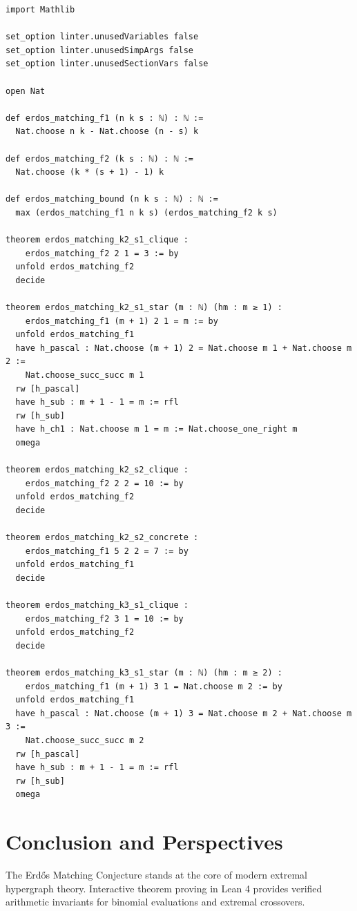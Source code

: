 \documentclass[11pt,a4paper]{article}
\theoremstyle{definition}
\begin{document}
\begin{lstlisting}[caption={Formal Lean 4 Implementation of Erdős Matching Bounds}]
import Mathlib

set_option linter.unusedVariables false
set_option linter.unusedSimpArgs false
set_option linter.unusedSectionVars false

open Nat

def erdos_matching_f1 (n k s : ℕ) : ℕ :=
  Nat.choose n k - Nat.choose (n - s) k

def erdos_matching_f2 (k s : ℕ) : ℕ :=
  Nat.choose (k * (s + 1) - 1) k

def erdos_matching_bound (n k s : ℕ) : ℕ :=
  max (erdos_matching_f1 n k s) (erdos_matching_f2 k s)

theorem erdos_matching_k2_s1_clique :
    erdos_matching_f2 2 1 = 3 := by
  unfold erdos_matching_f2
  decide

theorem erdos_matching_k2_s1_star (m : ℕ) (hm : m ≥ 1) :
    erdos_matching_f1 (m + 1) 2 1 = m := by
  unfold erdos_matching_f1
  have h_pascal : Nat.choose (m + 1) 2 = Nat.choose m 1 + Nat.choose m 2 :=
    Nat.choose_succ_succ m 1
  rw [h_pascal]
  have h_sub : m + 1 - 1 = m := rfl
  rw [h_sub]
  have h_ch1 : Nat.choose m 1 = m := Nat.choose_one_right m
  omega

theorem erdos_matching_k2_s2_clique :
    erdos_matching_f2 2 2 = 10 := by
  unfold erdos_matching_f2
  decide

theorem erdos_matching_k2_s2_concrete :
    erdos_matching_f1 5 2 2 = 7 := by
  unfold erdos_matching_f1
  decide

theorem erdos_matching_k3_s1_clique :
    erdos_matching_f2 3 1 = 10 := by
  unfold erdos_matching_f2
  decide

theorem erdos_matching_k3_s1_star (m : ℕ) (hm : m ≥ 2) :
    erdos_matching_f1 (m + 1) 3 1 = Nat.choose m 2 := by
  unfold erdos_matching_f1
  have h_pascal : Nat.choose (m + 1) 3 = Nat.choose m 2 + Nat.choose m 3 :=
    Nat.choose_succ_succ m 2
  rw [h_pascal]
  have h_sub : m + 1 - 1 = m := rfl
  rw [h_sub]
  omega
\end{lstlisting}

\section{Conclusion and Perspectives}
The Erd\H{o}s Matching Conjecture stands at the core of modern extremal hypergraph theory. Interactive theorem proving in Lean 4 provides verified arithmetic invariants for binomial evaluations and extremal crossovers.
\end{document}
